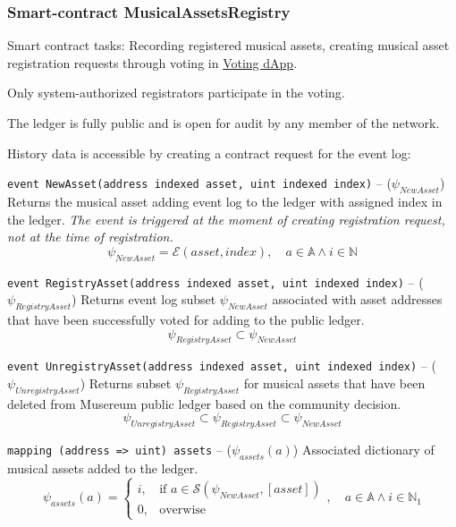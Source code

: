 \documentclass[12pt]{report}
\def\code#1{\colorbox{light-gray}{\texttt{#1}}}
\begin{document}
\subsubsection{Smart-contract MusicalAssetsRegistry}
\label{tech-apps-assets-registry}
Smart contract tasks: Recording registered musical assets, creating musical asset registration requests through voting in \hyperref[tech-apps-voting]{Voting dApp}.

Only system-authorized registrators participate in the voting.

The ledger is fully public and is open for audit by any member of the network.

History data is accessible by creating a contract request for the event log:

\code{event NewAsset(address indexed asset, uint indexed index)} – ($\psi_{NewAsset}$)\hfill\null\linebreak
Returns the musical asset adding event log  to the ledger with assigned index in the ledger.
\textit{The event is triggered at the moment of creating registration request, not at the time of registration.}
\begin{equation}
\psi_{NewAsset} = \mathcal{E}(asset, index), \quad a \in \mathbb{A} \wedge i \in \mathbb{N}
\end{equation}

\code{event RegistryAsset(address indexed asset, uint indexed index)} – ($\psi_{RegistryAsset}$)\hfill\null\linebreak
Returns event log subset $\psi_{NewAsset}$ associated with asset addresses that have been successfully voted for adding to the public ledger.
\begin{equation}
\psi_{RegistryAsset} \subset \psi_{NewAsset}
\end{equation}

\code{event UnregistryAsset(address indexed asset, uint indexed index)} – ($\psi_{UnregistryAsset}$)\hfill\null\linebreak
Returns subset $\psi_{RegistryAsset}$ for musical assets that have been deleted from Musereum public ledger based on the community decision.
\begin{equation}
\psi_{UnregistryAsset} \subset \psi_{RegistryAsset} \subset \psi_{NewAsset}
\end{equation}

\code{mapping (address => uint) assets} – ($\psi_{assets}(a)$)\hfill\null\linebreak
Associated dictionary of musical assets added to the ledger. 
\begin{equation}
\psi_{assets}(a) = \begin{cases}
	i, & \text{if } a \in \mathcal{S}(\psi_{NewAsset}, [{asset}]) \\
	0, & \text{overwise}
\end{cases}, \quad a \in \mathbb{A} \wedge i \in \mathbb{N}_1
\end{equation}
\end{document}
